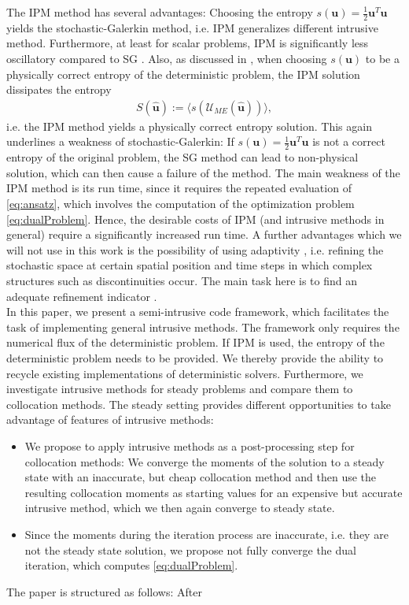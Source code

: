 The IPM method has several advantages: Choosing the entropy $s(\bm{u}) = \frac{1}{2}\bm{u}^T\bm{u}$ yields the stochastic-Galerkin method, i.e. IPM generalizes different intrusive method. Furthermore, at least for scalar problems, IPM is significantly less oscillatory compared to SG \cite{kusch2017maximum}. Also, as discussed in \cite{poette2009uncertainty}, when choosing $s(\bm u)$ to be a physically correct entropy of the deterministic problem, the IPM solution dissipates the entropy
\begin{align*}
S(\bm{\hat u}) := \langle s( \mathcal{U}_{ME}(\bm{\hat u}))\rangle,
\end{align*}
i.e. the IPM method yields a physically correct entropy solution. This again underlines a weakness of stochastic-Galerkin: If $s(\bm{u}) = \frac{1}{2}\bm{u}^T\bm{u}$ is not a correct entropy of the original problem, the SG method can lead to non-physical solution, which can then cause a failure of the method. The main weakness of the IPM method is its run time, since it requires the repeated evaluation of \eqref{eq:ansatz}, which involves the computation of the optimization problem \eqref{eq:dualProblem}. Hence, the desirable costs of IPM (and intrusive methods in general) require a significantly increased run time. A further advantages which we will not use in this work is the possibility of using adaptivity \cite{kroker2012finite}, i.e. refining the stochastic space at certain spatial position and time steps in which complex structures such as discontinuities occur. The main task here is to find an adequate refinement indicator \cite{kroker2012finite,giesselmann2017posteriori}.\\

In this paper, we present a semi-intrusive code framework, which facilitates the task of implementing general intrusive methods. The framework only requires the numerical flux of the deterministic problem. If IPM is used, the entropy of the deterministic problem needs to be provided. We thereby provide the ability to recycle existing implementations of deterministic solvers.
Furthermore, we investigate intrusive methods for steady problems and compare them to collocation methods. The steady setting provides different opportunities to take advantage of features of intrusive methods: 
\begin{itemize}
\item We propose to apply intrusive methods as a post-processing step for collocation methods: We converge the moments of the solution to a steady state with an inaccurate, but cheap collocation method and then use the resulting collocation moments as starting values for an expensive but accurate intrusive method, which we then again converge to steady state. 
\item Since the moments during the iteration process are inaccurate, i.e. they are not the steady state solution, we propose not fully converge the dual iteration, which computes \eqref{eq:dualProblem}. 
\end{itemize}

The paper is structured as follows: After 

